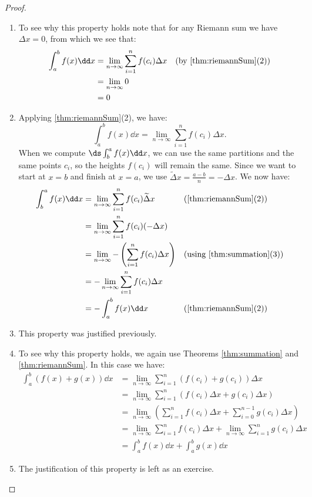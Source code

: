 \begin{proof}\label{pf:defintprop}
\mbox{}\\[-2\baselineskip]
\begin{enumerate}
\item To see why this property holds note that for any Riemann sum we have $\Delta x=0$, from which we see that: 
\begin{align*}
\int_a^b f(x)\dd x
&=\lim_{n\to\infty}\sum_{i=1}^n f(c_i)\Delta x
\quad \text{(by \autoref{thm:riemannSum}(2))}\\
&=\lim_{n\to\infty} 0\\
&=0\\
\end{align*}

\item Applying \autoref{thm:riemannSum}(2), we have:
\[\int_a^b f(x)\dd x=\lim_{n\to\infty}\sum_{i=1}^n f(c_i)\Delta x.\]
When we compute $\ds\int_b^a f(x)\dd x$, we can use the same partitions and the same points $c_i$, so the heights $f(c_i)$ will remain the same. Since we want to start at $x=b$ and finish at $x=a$, we use $\widetilde\Delta x=\frac{a-b}n=-\Delta x$. We now have:
\begin{align*}
\int_b^a f(x)\dd x
&=\lim_{n\to\infty} \sum_{i=1}^n f(c_i)\widetilde\Delta x
&&\text{(\autoref{thm:riemannSum}(2))}\\
&=\lim_{n\to\infty} \sum_{i=1}^n f(c_i)(-\Delta x)\\
&=\lim_{n\to\infty} -\left(\sum_{i=1}^n f(c_i)\Delta x\right)
&&\text{(using \autoref{thm:summation}(3))}\\
&=-\lim_{n\to\infty} \sum_{i=1}^n f(c_i)\Delta x\\
&=-\int_a^b f(x)\dd x &&\text{(\autoref{thm:riemannSum}(2))}
\end{align*}

\item This property was justified previously.

\item To see why this property holds, we again use Theorems \ref{thm:summation} and \ref{thm:riemannSum}. In this case we have:
{\allowdisplaybreaks
\begin{align*}
\int_a^b(f(x)+g(x))\dd x
&=\lim_{n\to\infty}\sum_{i=1}^n(f(c_i)+g(c_i))\Delta x\\
&=\lim_{n\to\infty} \sum_{i=1}^n (f(c_i)\Delta x+g(c_i)\Delta x)\\
&=\lim_{n\to\infty}\left(\sum_{i=1}^n f(c_i)\Delta x
+\sum_{i=0}^{n-1} g(c_i)\Delta x\right)\\
&=\lim_{n\to\infty}\sum_{i=1}^n f(c_i)\Delta x
+\lim_{n\to\infty}\sum_{i=1}^n g(c_i)\Delta x\\
&=\int_a^b f(x)\dd x+\int_a^bg(x)\dd x
\end{align*}}

\item The justification of this property is left as an exercise.\qedhere
\end{enumerate}
\end{proof}

